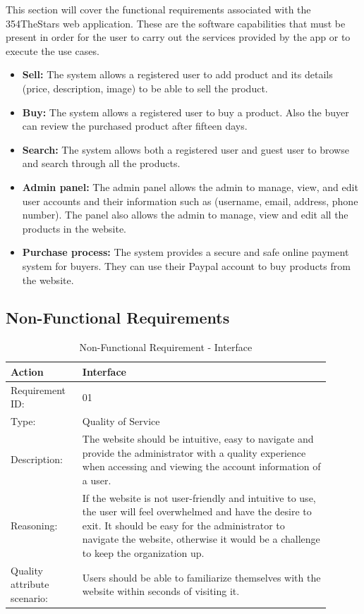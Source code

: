 \documentclass[11pt]{article}
\newcounter{use case ID}
\newcommand\addrow[2]{#1 & #2\\ \hline}
\newcounter{req ID}
\newcommand\tabularheadfsd[1]{
            \begin{table}[ht]
                \addtocounter{req ID}{1}
                \caption{Non-Functional Requirement \arabic{req ID} - #1}
                \vspace{0.2cm}
                \begin{tabular}{|p{0.2\linewidth}|p{0.70\linewidth}|}
                    \hline
                    \textbf{Action} & \textbf{#1} \\
                    \hline}
\newenvironment{requirement}{\tabularheadfsd}
                {\hline\end{tabular}\end{table}}
\begin{document}
This section will cover the functional requirements associated with the 354TheStars web application. These are the software capabilities that must be present in order for the user to carry out the services provided by the app or to execute the use cases.

\begin{itemize}
    \item \textbf{Sell:} The system allows a registered user to add product and its details (price, description, image) to be able to sell the product.
    \item \textbf{Buy:} The system allows a registered user to buy a product. Also the buyer can review the purchased product after fifteen days.
    \item  \textbf{Search:} The system allows both a registered user and guest user to browse and search through all the products.
    \item  \textbf{Admin panel:} The admin panel allows the admin to manage, view, and edit user accounts and their information such as (username, email, address, phone number). The panel also allows the admin to manage, view and edit all the products in the website.
    \item \textbf{Purchase process:} The system provides a secure and safe online payment system for buyers. They can use their Paypal account to buy products from the website.
\end{itemize}

\clearpage

\subsection{Non-Functional Requirements}\label{nonfunc req}

\begin{requirement}{Interface}
    \addrow{Requirement ID:}{01}
    \addrow{Type:}{Quality of Service}
    \addrow{Description:}{The website should be intuitive, easy to navigate and provide the administrator with a quality experience when accessing and viewing the account information of a user.}
    \addrow{Reasoning:}{If the website is not user-friendly and intuitive to use, the user will feel overwhelmed and have the desire to exit. It should be easy for the administrator to navigate the website, otherwise it would be a challenge to keep the organization up.}
    \addrow{Quality attribute scenario:}{Users should be able to familiarize themselves with the website within seconds of visiting it.}
\end{requirement}
\end{document}
